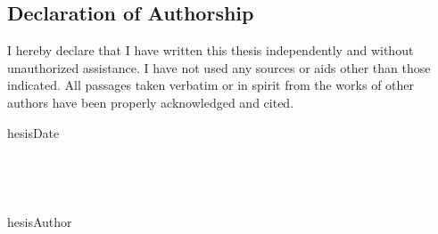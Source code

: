 \documentclass[
	twoside,
	fontsize=12pt,
	headsepline,
	cleardoublepage=empty,
	numbers=noenddot,
	bibliography=totoc,
]{scrbook}
\begin{document}

  

\tableofcontents

\cleardoublepage
{}








\listoffigures
\lstlistoflistings
%
%
\printbibliography

\cleardoublepage
\thispagestyle{empty}
\subsection*{Declaration of Authorship}

I hereby declare that I have written this thesis independently and without unauthorized assistance. I have not used any sources or aids other than those indicated. All passages taken verbatim or in spirit from the works of other authors have been properly acknowledged and cited.

	hesisDate

~

~

	hesisAuthor
\end{document}
